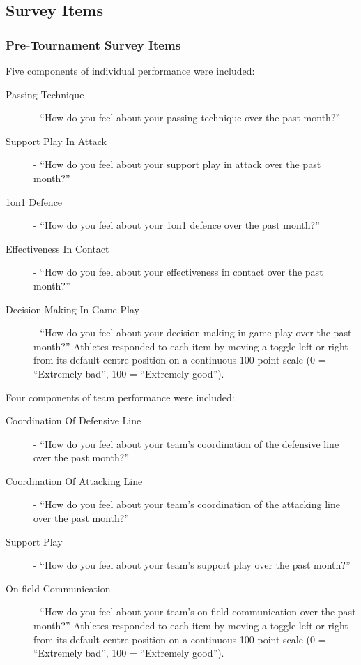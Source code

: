   \subsection{Survey Items\label{app8:surveyItems} }


  \subsubsection{Pre-Tournament Survey Items\label{app8:surveyPre}}



    Five components of individual performance were included:
    \begin{description}
    \item[Passing Technique] - ``How do you feel about your passing technique over the past month?''
    \item[Support Play In Attack] - ``How do you feel about your support play in attack over the past month?''
    \item[1on1 Defence] - ``How do you feel about your 1on1 defence over the past month?''
    \item[Effectiveness In Contact] - ``How do you feel about your effectiveness in contact over the past month?''
    \item[Decision Making In Game-Play] - ``How do you feel about your decision making in game-play over the past month?''
    Athletes responded to each item by moving a toggle left or right from its default centre position on a continuous 100-point scale (0 = ``Extremely bad'', 100 = ``Extremely good'').
    \end{description}

    Four components of team performance were included:
    \begin{description}
    \item[Coordination Of Defensive Line] - ``How do you feel about your team's coordination of the defensive line over the past month?''
    \item[Coordination Of Attacking Line] - ``How do you feel about your team's coordination of the attacking line over the past month?''
    \item[Support Play] - ``How do you feel about your team's support play over the past month?''
    \item[On-field Communication] - ``How do you feel about your team's on-field communication over the past month?''
    Athletes responded to each item by moving a toggle left or right from its default centre position on a continuous 100-point scale (0 = ``Extremely bad'', 100 = ``Extremely good'').
    \end{description}

